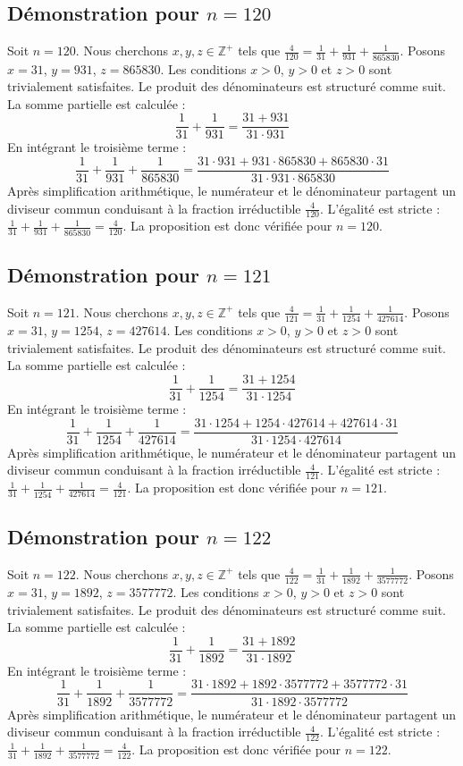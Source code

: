 \documentclass[11pt,a4paper]{article}
\begin{document}
\subsection{Démonstration pour $n = 120$}
Soit $n = 120$. Nous cherchons $x, y, z \in \mathbb{Z}^{+}$ tels que $\frac{4}{120} = \frac{1}{31} + \frac{1}{931} + \frac{1}{865830}$.
Posons $x = 31$, $y = 931$, $z = 865830$.
Les conditions $x > 0$, $y > 0$ et $z > 0$ sont trivialement satisfaites.
Le produit des dénominateurs est structuré comme suit. La somme partielle est calculée :
$$ \frac{1}{31} + \frac{1}{931} = \frac{31+931}{31 \cdot 931} $$
En intégrant le troisième terme :
$$ \frac{1}{31} + \frac{1}{931} + \frac{1}{865830} = \frac{31 \cdot 931 + 931 \cdot 865830 + 865830 \cdot 31}{31 \cdot 931 \cdot 865830} $$
Après simplification arithmétique, le numérateur et le dénominateur partagent un diviseur commun conduisant à la fraction irréductible $\frac{4}{120}$.
L'égalité est stricte : $\frac{1}{31} + \frac{1}{931} + \frac{1}{865830} = \frac{4}{120}$.
La proposition est donc vérifiée pour $n = 120$.
\subsection{Démonstration pour $n = 121$}
Soit $n = 121$. Nous cherchons $x, y, z \in \mathbb{Z}^{+}$ tels que $\frac{4}{121} = \frac{1}{31} + \frac{1}{1254} + \frac{1}{427614}$.
Posons $x = 31$, $y = 1254$, $z = 427614$.
Les conditions $x > 0$, $y > 0$ et $z > 0$ sont trivialement satisfaites.
Le produit des dénominateurs est structuré comme suit. La somme partielle est calculée :
$$ \frac{1}{31} + \frac{1}{1254} = \frac{31+1254}{31 \cdot 1254} $$
En intégrant le troisième terme :
$$ \frac{1}{31} + \frac{1}{1254} + \frac{1}{427614} = \frac{31 \cdot 1254 + 1254 \cdot 427614 + 427614 \cdot 31}{31 \cdot 1254 \cdot 427614} $$
Après simplification arithmétique, le numérateur et le dénominateur partagent un diviseur commun conduisant à la fraction irréductible $\frac{4}{121}$.
L'égalité est stricte : $\frac{1}{31} + \frac{1}{1254} + \frac{1}{427614} = \frac{4}{121}$.
La proposition est donc vérifiée pour $n = 121$.
\subsection{Démonstration pour $n = 122$}
Soit $n = 122$. Nous cherchons $x, y, z \in \mathbb{Z}^{+}$ tels que $\frac{4}{122} = \frac{1}{31} + \frac{1}{1892} + \frac{1}{3577772}$.
Posons $x = 31$, $y = 1892$, $z = 3577772$.
Les conditions $x > 0$, $y > 0$ et $z > 0$ sont trivialement satisfaites.
Le produit des dénominateurs est structuré comme suit. La somme partielle est calculée :
$$ \frac{1}{31} + \frac{1}{1892} = \frac{31+1892}{31 \cdot 1892} $$
En intégrant le troisième terme :
$$ \frac{1}{31} + \frac{1}{1892} + \frac{1}{3577772} = \frac{31 \cdot 1892 + 1892 \cdot 3577772 + 3577772 \cdot 31}{31 \cdot 1892 \cdot 3577772} $$
Après simplification arithmétique, le numérateur et le dénominateur partagent un diviseur commun conduisant à la fraction irréductible $\frac{4}{122}$.
L'égalité est stricte : $\frac{1}{31} + \frac{1}{1892} + \frac{1}{3577772} = \frac{4}{122}$.
La proposition est donc vérifiée pour $n = 122$.
\end{document}
